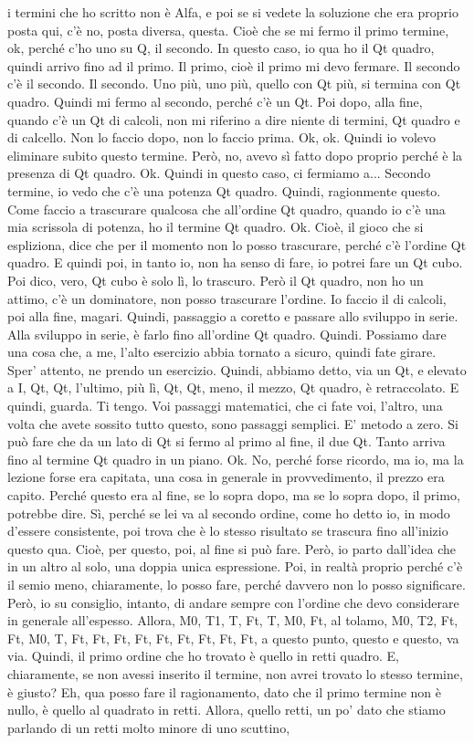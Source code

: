 \begin{soluzione}
   i termini che ho scritto non è Alfa, e poi se si vedete la soluzione che era proprio posta qui, c'è no, posta diversa, questa. Cioè che se mi fermo il primo termine, ok, perché c'ho uno su Q, il secondo. In questo caso, io qua ho il Qt quadro, quindi arrivo fino ad il primo. Il primo, cioè il primo mi devo fermare. Il secondo c'è il secondo. Il secondo. Uno più, uno più, quello con Qt più, si termina con Qt quadro. Quindi mi fermo al secondo, perché c'è un Qt. Poi dopo, alla fine, quando c'è un Qt di calcoli, non mi riferino a dire niente di termini, Qt quadro e di calcello. Non lo faccio dopo, non lo faccio prima. Ok, ok. Quindi io volevo eliminare subito questo termine. Però, no, avevo sì fatto dopo proprio perché è la presenza di Qt quadro. Ok. Quindi in questo caso, ci fermiamo a... Secondo termine, io vedo che c'è una potenza Qt quadro. Quindi, ragionmente questo. Come faccio a trascurare qualcosa che all'ordine Qt quadro, quando io c'è una mia scrissola di potenza, ho il termine Qt quadro. Ok. Cioè, il gioco che si espliziona, dice che per il momento non lo posso trascurare, perché c'è l'ordine Qt quadro. E quindi poi, in tanto io, non ha senso di fare, io potrei fare un Qt cubo. Poi dico, vero, Qt cubo è solo lì, lo trascuro. Però il Qt quadro, non ho un attimo, c'è un dominatore, non posso trascurare l'ordine. Io faccio il di calcoli, poi alla fine, magari. Quindi, passaggio a coretto e passare allo sviluppo in serie. Alla sviluppo in serie, è farlo fino all'ordine Qt quadro. Quindi. Possiamo dare una cosa che, a me, l'alto esercizio abbia tornato a sicuro, quindi fate girare. Sper' attento, ne prendo un esercizio. Quindi, abbiamo detto, via un Qt, e elevato a I, Qt, Qt, l'ultimo, più lì, Qt, Qt, meno, il mezzo, Qt quadro, è retraccolato. E quindi, guarda. Ti tengo. Voi passaggi matematici, che ci fate voi, l'altro, una volta che avete sossito tutto questo, sono passaggi semplici. E' metodo a zero. Si può fare che da un lato di Qt si fermo al primo al fine, il due Qt. Tanto arriva fino al termine Qt quadro in un piano. Ok. No, perché forse ricordo, ma io, ma la lezione forse era capitata, una cosa in generale in provvedimento, il prezzo era capito. Perché questo era al fine, se lo sopra dopo, ma se lo sopra dopo, il primo, potrebbe dire. Sì, perché se lei va al secondo ordine, come ho detto io, in modo d'essere consistente, poi trova che è lo stesso risultato se trascura fino all'inizio questo qua. Cioè, per questo, poi, al fine si può fare. Però, io parto dall'idea che in un altro al solo, una doppia unica espressione. Poi, in realtà proprio perché c'è il semio meno, chiaramente, lo posso fare, perché davvero non lo posso significare. Però, io su consiglio, intanto, di andare sempre con l'ordine che devo considerare in generale all'espesso. Allora, M0, T1, T, Ft, T, M0, Ft, al tolamo, M0, T2, Ft, Ft, M0, T, Ft, Ft, Ft, Ft, Ft, Ft, Ft, Ft, Ft, a questo punto, questo e questo, va via. Quindi, il primo ordine che ho trovato è quello in retti quadro. E, chiaramente, se non avessi inserito il termine, non avrei trovato lo stesso termine, è giusto? Eh, qua posso fare il ragionamento, dato che il primo termine non è nullo, è quello al quadrato in retti. Allora, quello retti, un po' dato che stiamo parlando di un retti molto minore di uno scuttino, 
\end{soluzione}

